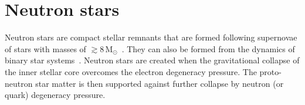 \documentclass[../Thesis.tex]{subfiles}
\begin{document}
    
    






    \section{Neutron stars}
    \label{sec:Intro:NeutronStars}
    Neutron stars are compact stellar remnants that are formed following supernovae of stars with masses of $\gtrsim 8\,\mathrm{M}_\odot$~\cite[e.g.,][]{Lattimer2004}.
    They can also be formed from the dynamics of binary star systems~\cite[e.g.,][]{Ruiter2019,LiuX2020,LiuD2020}.
    Neutron stars are created when the gravitational collapse of the inner stellar core overcomes the electron degeneracy pressure.
    The proto-neutron star matter is then supported against further collapse by neutron (or quark) degeneracy pressure. \par
    
\end{document}
